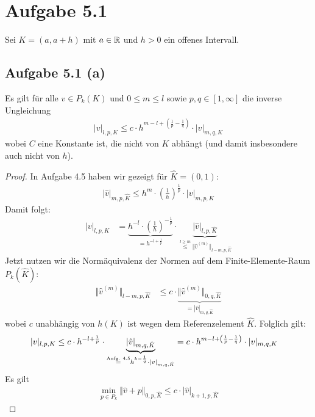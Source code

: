 \documentclass[12pt,a4paper]{article}
\author{Willi Sontopski}
\begin{document}

\section*{Aufgabe 5.1}
Sei $K=(a,a+h)$ mit $a\in\mathbb{R}$ und $h>0$ ein offenes Intervall.

\subsection*{Aufgabe 5.1 (a)}
Es gilt für alle $v\in P_k(K)$ und $0\leq m\leq l$ sowie $p,q\in[1,\infty]$ die inverse Ungleichung
\begin{align*}
|v|_{l,p,K}\leq c\cdot h^{m-l+\left(\frac{1}{p}-\frac{1}{q}\right)}\cdot|v|_{m,q,K}
\end{align*}
wobei $C$ eine Konstante ist, die nicht von $K$ abhängt (und damit insbesondere auch nicht von $h$).

\begin{proof}
In Aufgabe 4.5 haben wir gezeigt für $\hat{K}=(0,1)$:
\begin{align*}
|\hat{v}|_{m,p,\hat{K}}\leq h^m\cdot\left(\frac{1}{h}\right)^{\frac{1}{p}}\cdot|v|_{m,p,K}
\end{align*}
Damit folgt:
\begin{align*}
|v|_{l,p,K}
&=\underbrace{h^{-l}\cdot\left(\frac{1}{h}\right)^{-\frac{1}{p}}}_{=h^{-l+\frac{1}{p}}}\cdot\underbrace{|\hat{v}|_{l,p,\hat{K}}}_{\stackrel{l\geq m}{\leq}\Vert \hat{v}^{(m)}\Vert_{l-m,p,\hat{K}}}
\end{align*}
Jetzt nutzen wir die Normäquivalenz der Normen auf dem Finite-Elemente-Raum $P_k(\hat{K})$:
\begin{align*}
\Vert \hat{v}^{(m)}\Vert_{l-m,p,\hat{K}}
&\leq
c\cdot\underbrace{\Vert\hat{v}^{(m)}\Vert_{0,q,\hat{K}}}_{=|\hat{v}|_{m,q,\hat{K}}}
\end{align*}
wobei $c$ unabhängig von $h(K)$ ist wegen dem Referenzelement $\hat{K}$. Folglich gilt:
\begin{align*}
|v|_{l,p,K}
&\leq
c\cdot h^{-l+\frac{1}{p}}\cdot\underbrace{|\hat{v}|_{m,q,\hat{K}}}_{\stackrel{\text{Aufg. 4.5}}{=}h^{k-\frac{1}{q}}\cdot|v|_{m,q,\hat{K}}}
=c\cdot h^{m-l+\left(\frac{1}{p}-\frac{1}{q}\right)}\cdot|v|_{m,q,K}
\end{align*}
Es gilt
\begin{align*}
\min\limits_{p\in P_k}\big\Vert\hat{v}+p\big\Vert_{0,p,\hat{K}}\leq c\cdot|\hat{v}|_{k+1,p,\hat{K}}
\end{align*}
\end{proof}
\end{document}
